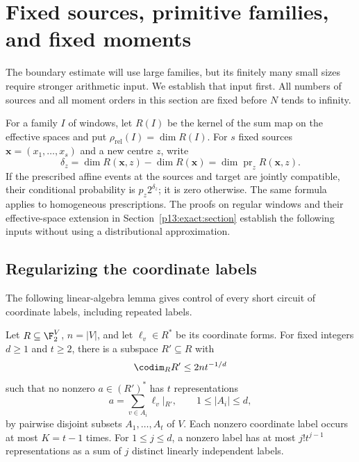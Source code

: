 \section{Fixed sources, primitive families, and fixed moments}
\label{p1:fixed:section}

The boundary estimate will use large families, but its finitely
many small sizes require stronger arithmetic input. We establish
that input first. All numbers of sources and all moment orders
in this section are fixed before \(N\) tends to infinity.

For a family \(I\) of windows, let \(R(I)\) be the kernel
of the sum map on the effective spaces and put \(\rho_{\mathrm{rel}}(I)=\dim R(I)\).
For \(s\) fixed sources \(\boldsymbol x=(x_1,\ldots,x_s)\) and a
new centre \(z\), write
\begin{equation}
 \delta_z=\dim R(\boldsymbol x,z)-\dim R(\boldsymbol x)
          =\dim\operatorname{pr}_z R(\boldsymbol x,z).
 \label{p1:fixed:delta}
\end{equation}
If the prescribed affine events at the sources and target are
jointly compatible, their conditional probability is
\(p_z2^{\delta_z}\); it is zero otherwise. The same formula applies
to homogeneous prescriptions. The proofs on regular windows and their
effective-space extension in Section~\ref{p13:exact:section} establish
the following inputs without using a distributional approximation.

\subsection{Regularizing the coordinate labels}

The following linear-algebra lemma gives control of every short
circuit of coordinate labels, including repeated labels.

\begin{lemma}
\label{p1:fixed:recovery}
Let \(R\subseteq\F_2^V\), \(n=|V|\), and let
\(\ell_v\in R^*\) be its coordinate forms. For fixed integers
\(d\ge1\) and \(t\ge2\), there is a subspace \(R'\subseteq R\)
with
\begin{equation}
 \codim_R R'\le 2n t^{-1/d}
 \label{p1:fixed:recovery-cost}
\end{equation}
such that no nonzero \(a\in(R')^*\) has \(t\) representations
\[
 a=\sum_{v\in A_i}\ell_v|_{R'},\qquad
 1\le |A_i|\le d,
\]
by pairwise disjoint subsets \(A_1,\ldots,A_t\) of \(V\).
Each nonzero coordinate label occurs at most \(K=t-1\) times.
For \(1\le j\le d\), a nonzero label has at most
\(j!t^{j-1}\) representations as a sum of \(j\) distinct
linearly independent labels.
\end{lemma}


